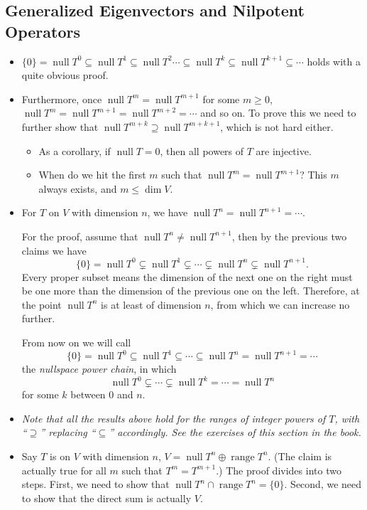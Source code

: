 \documentclass[11pt]{article}
\newcommand{\n}{\operatorname{null}}
\renewcommand{\r}{\operatorname{range}}
\renewcommand{\d}{\dim}
\begin{document}
\subsection{Generalized Eigenvectors and Nilpotent Operators}
\begin{itemize}
    \item $\{0\} = \n T^0 \subseteq \n T^1 \subseteq \n T^2 \cdots \subseteq \n T^k \subseteq \n T^{k+1} \subseteq \cdots$ holds with a quite obvious proof.
        \item Furthermore, once $\n T^m = \n T^{m+1}$ for some $m \geq 0$, $\n T^m = \n T^{m+1} = \n T^{m+2} = \cdots$ and so on. To prove this we need to further show that $\n T^{m+k} \supseteq \n T^{m+k+1}$, which is not hard either.
        \begin{itemize}
            \item As a corollary, if $\n T = {0}$, then all powers of $T$ are injective.
            \item When do we hit the first $m$ such that $\n T^m = \n T^{m+1}$? This $m$ always exists, and $m \leq \d V$.
        \end{itemize}
    \item For $T$ on $V$ with dimension $n$, we have $\n T^n = \n T^{n+1} = \cdots$.
    
    For the proof, assume that $\n T^n \ne \n T^{n+1}$, then by the previous two claims we have
    $$\{0\} = \n T^0 \subsetneq \n T^1 \subsetneq \cdots \subsetneq \n T^n \subsetneq \n T^{n+1}.$$
    Every proper subset means the dimension of the next one on the right must be one more than the dimension of the previous one on the left. Therefore, at the point $\n T^n$ is at least of dimension $n$, from which we can increase no further.
    
    From now on we will call \[\{0\} = \n T^0 \subseteq \n T^1 \subseteq \cdots \subseteq \n T^n = \n T^{n+1} = \cdots\] the \emph{nullspace power chain}, in which \[\n T^0 \subsetneq \cdots \subsetneq \n T^k = \cdots = \n T^n\] for some $k$ between $0$ and $n$.
    
    \item \emph{Note that all the results above hold for the ranges of integer powers of $T$, with ``$\supseteq$'' replacing ``$\subseteq$'' accordingly. See the exercises of this section in the book.}
    \item Say $T$ is on $V$ with dimension $n$, $V = \n T^n \oplus \r T^n$. (The claim is actually true for all $m$ such that $T^m = T^{m+1}$.)
    The proof divides into two steps. First, we need to show that $\n T^n \cap \r T^n = \{0\}$. Second, we need to show that the direct sum is actually $V$.
    

\end{itemize}
\end{document}
